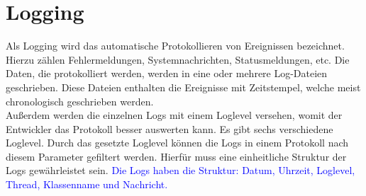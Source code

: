 \section{Logging}\label{sec:logging}
Als Logging wird das automatische Protokollieren von Ereignissen bezeichnet.
Hierzu zählen Fehlermeldungen, Systemnachrichten, Statusmeldungen, etc.
Die Daten, die protokolliert werden, werden in eine oder mehrere Log-Dateien geschrieben.
Diese Dateien enthalten die Ereignisse mit Zeitstempel, welche meist chronologisch geschrieben werden.\autocite{ip-insider}
\\
Außerdem werden die einzelnen Logs mit einem Loglevel versehen, womit der Entwickler das Protokoll besser auswerten kann.
Es gibt sechs verschiedene Loglevel.
Durch das gesetzte Loglevel können die Logs in einem Protokoll nach diesem Parameter gefiltert werden.
Hierfür muss eine einheitliche Struktur der Logs gewährleistet sein.
\textcolor{blue}{
    Die Logs haben die Struktur: Datum, Uhrzeit, Loglevel, Thread, Klassenname und Nachricht.}
\\
